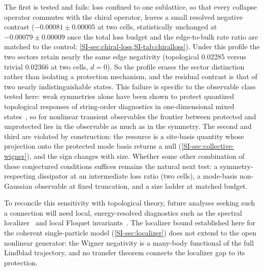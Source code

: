 \documentclass[aps,pra,preprint,superscriptaddress,amsmath,amssymb]{revtex4-2}
\begin{document}
The first is tested and fails: loss confined to one sublattice, so that every collapse operator commutes with the chiral operator, leaves a small resolved negative contrast ($-\num{0.00081}\pm\num{0.00005}$ at two cells, statistically unchanged at $-\num{0.00079}\pm\num{0.00009}$ once the total loss budget and the edge-to-bulk rate ratio are matched to the control; \cref{SI-sec:chiral-loss,SI-tab:chiralloss}). Under this profile the two sectors retain nearly the same edge negativity (topological \num{0.02285} versus trivial \num{0.02366} at two cells, $d=\num{0}$). So the profile erases the sector distinction rather than isolating a protection mechanism, and the residual contrast is that of two nearly indistinguishable states. This failure is specific to the observable class tested here: weak symmetries alone have been shown to protect quantized topological responses of string-order diagnostics in one-dimensional mixed states~\cite{Huang2025weaksymmetries}, so for nonlinear transient observables the frontier between protected and unprotected lies in the observable as much as in the symmetry. The second and third are violated by construction: the resource is a site-basis quantity whose projection onto the protected mode basis returns a null (\cref{SI-sec:collective-wigner}), and the sign changes with size. Whether some other combination of these conjectured conditions suffices remains the natural next test: a symmetry-respecting dissipator at an intermediate loss ratio (two cells), a mode-basis non-Gaussian observable at fixed truncation, and a size ladder at matched budget.

To reconcile this sensitivity with topological theory, future analyses seeking such a connection will need local, energy-resolved diagnostics such as the spectral localizer~\cite{CerjanLoring2025Tutorial, WongCerjanCole2024Quantitative} and local Floquet invariants~\cite{Ghosh2024Local}. The localizer bound established here for the coherent single-particle model (\cref{SI-sec:localizer}) does not extend to the open nonlinear generator: the Wigner negativity is a many-body functional of the full Lindblad trajectory, and no transfer theorem connects the localizer gap to its protection.
\end{document}
